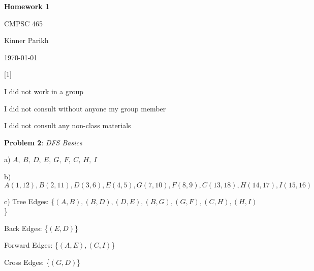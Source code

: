 \documentclass{article} %
\newcommand{\question}[2][]{\begin{flushleft}
        \textbf{Problem #1}: \textit{#2}

\end{flushleft}}
\newcommand{\maketitletwo}[2][]{\begin{center}
        \Large{\textbf{Homework #1}
            
            CMPSC 465} %
        \vspace{5pt}
        
        \normalsize{Kinner Parikh  %
        
        \today}        %
        \vspace{40pt}


        \newpage
        
\end{center}}
\begin{document}
    \maketitletwo[1]  %

    \question[1]{}
    \begin{center}
        
        I did not work in a group
    
        I did not consult without anyone my group member
    
        I did not consult any non-class materials
    \end{center}
    
    \newpage

    \question[2]{DFS Basics}

    a) $A,\ B,\ D,\ E,\ G,\ F,\ C,\ H,\ I$

    \vspace{5pt}

    
    b) $A(1, 12), B(2, 11), D(3, 6), E(4, 5), G(7, 10), F(8, 9), C(13, 18), H(14, 17), I(15, 16)$
    
    \vspace{5pt}
    
    c) Tree Edges: \hspace{16pt}\{$(A, B), (B, D), (D, E), (B, G), (G, F), (C, H), (H, I)$\}
    
    \hspace{12pt}Back Edges: \hspace{14pt}\{$(E, D)$\}
    
    \hspace{12pt}Forward Edges: \{$(A, E), (C, I)$\}
    
    \hspace{12pt}Cross Edges: \hspace{12pt}\{$(G, D)$\}
\end{document}
